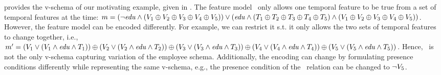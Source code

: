  provides the v-schema of our motivating example, given in .
The feature model \fModel\ only allows one temporal feature to be true from a set of temporal features at the time: 
\ensuremath{
\fModel = 
\left( 
\neg \edu \wedge \left(
\vOne \oplus \vTwo \oplus \vThree \oplus \vFour \oplus \vFive
\right) \right)
\vee 
\left( \edu \wedge \left(
\tOne \oplus \tTwo \oplus \tThree \oplus \tFour \oplus \tFive
\right) \wedge
 \left(
\vOne \oplus \vTwo \oplus \vThree \oplus \vFour \oplus \vFive
\right) \right)
}. 
However, the feature model can be encoded differently. For example, we can restrict it s.t. it only allows 
the two sets of temporal features to change together, i.e.,
\ensuremath{
\VVal \fModel = 
\left( \vOne \vee \left(\vOne \wedge \edu \wedge \tOne \right) \right)
\oplus
\left( \vTwo \vee \left(\vTwo \wedge \edu \wedge \tTwo \right) \right)
\oplus
\left( \vThree \vee \left(\vThree \wedge \edu \wedge \tThree \right) \right)
\oplus
\left( \vFour \vee \left(\vFour \wedge \edu \wedge \tFour \right) \right)
\oplus
\left( \vFive \vee \left(\vFive \wedge \edu \wedge \tFive \right) \right)
}. 
Hence, 
\fModel\ is not the only v-schema capturing variation of the employee schema. 
Additionally, the encoding can change by formulating presence conditions differently while representing the same v-schema, 
e.g., the presence condition of the \job\ relation can be changed to \ensuremath{\neg \vFive}. 

